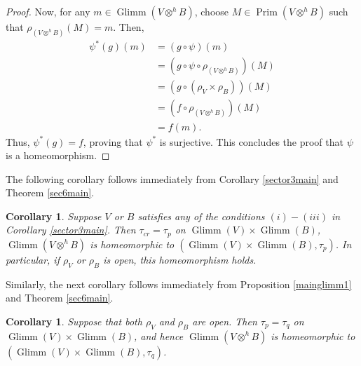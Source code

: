 \documentclass{birkjour}
\newtheorem{cor}[thm]{Corollary}
\theoremstyle{definition}
\theoremstyle{remark}
\numberwithin{equation}{section}
\begin{document}
\begin{proof}
Now, for any \(m \in \operatorname{Glimm}(V\otimes^h B)\), choose \(M \in \operatorname{Prim}(V\otimes^h B)\) such that \(\rho_{(V \otimes^h B)}(M) = m\). Then,  
\[
\begin{aligned}
\psi^*(g)(m) &= (g \circ \psi)(m) \\
&= (g \circ \psi \circ \rho_{(V \otimes^h B)})(M) \\
&= (g \circ (\rho_V \times \rho_B))(M) \\
&= (f \circ \rho_{(V \otimes^h B)})(M) \\
&= f(m).
\end{aligned}
\]
Thus, \(\psi^*(g) = f\), proving that \(\psi^*\) is surjective. This concludes the proof that \(\psi\) is a homeomorphism.  





    
\end{proof}




















The following corollary follows immediately from Corollary \ref{sector3main} and Theorem \ref{sec6main}. 



 

\begin{cor}
    Suppose $V$ or $B$ satisfies any of the conditions $(i)-(iii)$ in Corollary \ref{sector3main}. Then $\tau_{cr}= \tau_p$ on $\operatorname{Glimm}(V) \times \operatorname{Glimm}(B)$,  $\operatorname{Glimm}(V \otimes^h B)$ is homeomorphic to $(\operatorname{Glimm}(V) \times \operatorname{Glimm}(B), \tau_p)$. In particular, if $\rho_V$ or $\rho_B$ is open, this homeomorphism holds. 

\end{cor}

Similarly, the next corollary follows immediately from Proposition \ref{mainglimm1} and Theorem \ref{sec6main}.
\begin{cor}
    Suppose that both $\rho_V$ and $\rho_B$ are open. Then $\tau_p= \tau_q$ on \\ $\operatorname{Glimm}(V) \times \operatorname{Glimm}(B)$, and hence $\operatorname{Glimm}(V \otimes^h B)$ is homeomorphic to \\ $(\operatorname{Glimm}(V) \times \operatorname{Glimm}(B), \tau_q)$. 
\end{cor}
\end{document}
